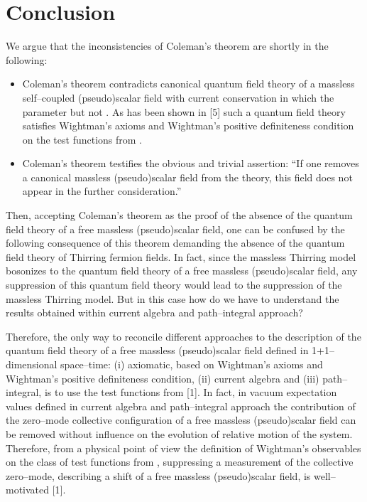 \documentclass[a4paper,12pt] {article}
\begin{document}
\section{Conclusion}
\setcounter{equation}{0}

\hspace{0.2in} We argue that the inconsistencies of Coleman's theorem
are shortly in the following:
\begin{itemize}
\item Coleman's theorem contradicts canonical quantum field theory of
a massless self--coupled (pseudo)scalar field \coordHE{} with
current conservation \coordHE{} in which the
parameter \myHighlight{$\sigma = 2\pi$}\coordHE{} but not \coordHE{}. As has been shown in
[5] such a quantum field theory satisfies Wightman's axioms and
Wightman's positive definiteness condition on the test functions
\coordHE{} from \coordHE{}.

\item Coleman's theorem testifies the obvious and trivial assertion:
``If one removes a canonical massless (pseudo)scalar field from the
theory, this field does not appear in the further consideration.''
\end{itemize}

Then, accepting Coleman's theorem as the proof of the absence of the
quantum field theory of a free massless (pseudo)scalar field, one can
be confused by the following consequence of this theorem demanding the
absence of the quantum field theory of Thirring fermion fields.  In
fact, since the massless Thirring model bosonizes to the quantum field
theory of a free massless (pseudo)scalar field, any suppression of
this quantum field theory would lead to the suppression of the
massless Thirring model. But in this case how do we have to understand
the results obtained within current algebra and path--integral
approach?

Therefore, the only way to reconcile different approaches to the
description of the quantum field theory of a free massless
(pseudo)scalar field defined in 1+1--dimensional space--time: (i)
axiomatic, based on Wightman's axioms and Wightman's positive
definiteness condition, (ii) current algebra and (iii) path--integral,
is to use the test functions from \coordHE{} [1].
In fact, in vacuum expectation values defined in current algebra and
path--integral approach the contribution of the zero--mode collective
configuration of a free massless (pseudo)scalar field can be removed
without influence on the evolution of relative motion of the
system. Therefore, from a physical point of view the definition of
Wightman's observables on the class of test functions from \coordHE{}, suppressing a measurement of the collective
zero--mode, describing a shift of a free massless (pseudo)scalar
field, is well--motivated [1].
\end{document}
